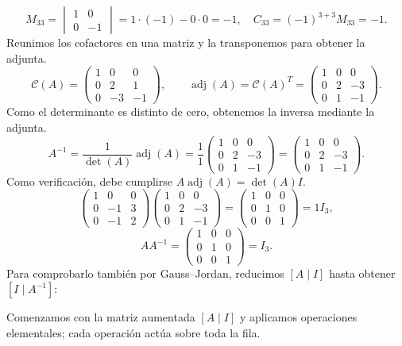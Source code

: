 \documentclass[12pt]{article}
\newcommand{\adj}{\operatorname{adj}}
\begin{document}
\[
M_{33}=\begin{vmatrix}1&0\\0&-1\end{vmatrix}=1\cdot (-1)-0\cdot 0=-1,\quad C_{33}=(-1)^{3+3}M_{33}=-1.
\]
Reunimos los cofactores en una matriz y la transponemos para obtener la adjunta.
\[
\mathcal{C}(A)=\begin{pmatrix}1&0&0\\0&2&1\\0&-3&-1\end{pmatrix},\qquad\adj(A)=\mathcal{C}(A)^T=\begin{pmatrix}1&0&0\\0&2&-3\\0&1&-1\end{pmatrix}.
\]
Como el determinante es distinto de cero, obtenemos la inversa mediante la adjunta.
\[
A^{-1}=\frac1{\det(A)}\adj(A)=\frac1{1}\begin{pmatrix}1&0&0\\0&2&-3\\0&1&-1\end{pmatrix}=\begin{pmatrix}1&0&0\\0&2&-3\\0&1&-1\end{pmatrix}.
\]
Como verificación, debe cumplirse $A\adj(A)=\det(A)I$.
\[
\begin{pmatrix}1&0&0\\0&-1&3\\0&-1&2\end{pmatrix}\begin{pmatrix}1&0&0\\0&2&-3\\0&1&-1\end{pmatrix}=\begin{pmatrix}1&0&0\\0&1&0\\0&0&1\end{pmatrix}=1I_{3},
\]
\[
AA^{-1}=\begin{pmatrix}1&0&0\\0&1&0\\0&0&1\end{pmatrix}=I_{3}.
\]
Para comprobarlo también por Gauss--Jordan, reducimos $[A\mid I]$ hasta obtener $[I\mid A^{-1}]$:

Comenzamos con la matriz aumentada $[A\mid I]$ y aplicamos operaciones elementales; cada operación actúa sobre toda la fila.
\end{document}

